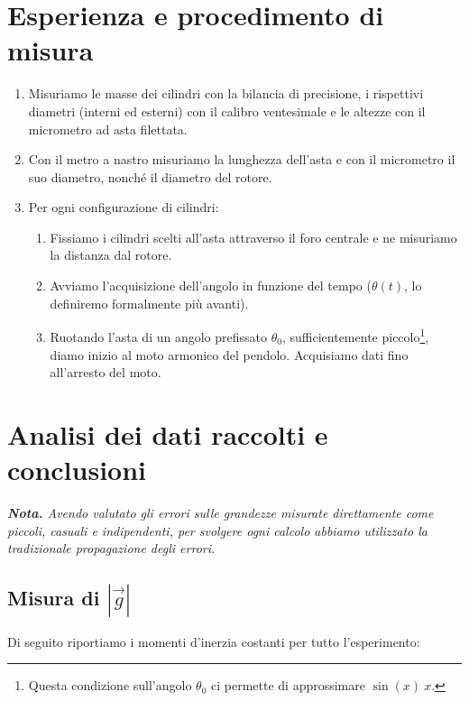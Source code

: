 \documentclass{article}
\begin{document}
\section{Esperienza e procedimento di misura}

\begin{enumerate}
    \item
        Misuriamo le masse dei cilindri con la bilancia di precisione,
        i rispettivi diametri (interni ed esterni) con il calibro ventesimale
        e le altezze con il micrometro ad asta filettata.
    \item
        Con il metro a nastro misuriamo la lunghezza dell'asta e con il
        micrometro il suo diametro, nonché il diametro del rotore.
    \item
        Per ogni configurazione di cilindri:  %
    \begin{enumerate}
        \item
            Fissiamo i cilindri scelti all'asta attraverso il foro centrale
            e ne misuriamo la distanza dal rotore.
        \item
            Avviamo l'acquisizione dell'angolo in funzione del tempo
            ($\theta(t)$, lo definiremo formalmente più avanti).
        \item
            Ruotando l'asta di un angolo prefissato $\theta_0$,
            sufficientemente piccolo\footnote{
                Questa condizione sull'angolo $\theta_0$ ci permette di
                approssimare $\sin(x) ~ x$.
            },
            diamo inizio al moto armonico del pendolo.
            Acquisiamo dati fino all'arresto del moto.
    \end{enumerate}
\end{enumerate}

\section{Analisi dei dati raccolti e conclusioni}
\emph{\textbf{Nota.}
Avendo valutato gli errori sulle grandezze misurate direttamente
come piccoli, casuali e indipendenti, per svolgere ogni calcolo
abbiamo utilizzato la tradizionale propagazione degli errori.
}

\subsection{Misura di $\left|\vec{g}\right|$}

Di seguito riportiamo i momenti d'inerzia costanti per tutto l'esperimento:
\end{document}
